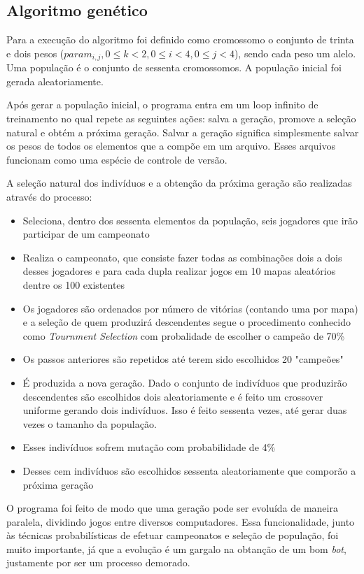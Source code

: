 \documentclass[a4paper,titlepage,11pt]{article}
\begin{document}
\subsection{Algoritmo genético}
Para a execução do algoritmo foi definido como cromossomo o conjunto de trinta e dois pesos ($param_{i,j}, 0 \leq k < 2, 0 \leq i < 4, 0 \leq j < 4$), sendo cada peso um alelo. Uma população é o conjunto de sessenta cromossomos. A população inicial foi gerada aleatoriamente.

Após gerar a população inicial, o programa entra em um loop infinito de treinamento no qual repete as seguintes ações: salva a geração, promove a seleção natural e obtém a próxima geração. Salvar a geração significa simplesmente salvar os pesos de todos os elementos que a compõe em um arquivo. Esses arquivos funcionam como uma espécie de controle de versão.

A seleção natural dos indivíduos e a obtenção da próxima geração são realizadas através do processo:
\begin{itemize}
	\item Seleciona, dentro dos sessenta elementos da população, seis jogadores que irão participar de um campeonato
	\item Realiza o campeonato, que consiste fazer todas as combinações dois a dois desses jogadores e para cada dupla realizar jogos em 10 mapas aleatórios dentre os 100 existentes 
	\item Os jogadores são ordenados por número de vitórias (contando uma por mapa) e a seleção de quem produzirá descendentes segue o procedimento conhecido como {\em Tournment Selection} com probalidade de escolher o campeão de 70\%
	\item Os passos anteriores são repetidos até terem sido escolhidos 20 "campeões"
	\item É produzida a nova geração. Dado o conjunto de indivíduos que produzirão descendentes são escolhidos dois aleatoriamente e é feito um crossover uniforme gerando dois indivíduos. Isso é feito sessenta vezes, até gerar duas vezes o tamanho da população. 
	\item Esses indivíduos sofrem mutação com probabilidade de 4\%
	\item Desses cem indivíduos são escolhidos sessenta aleatoriamente que comporão a próxima geração
\end{itemize}

O programa foi feito de modo que uma geração pode ser evoluída de maneira paralela, dividindo jogos entre diversos computadores. Essa funcionalidade, junto às técnicas probabilísticas de efetuar campeonatos e seleção de população, foi muito importante, já que a evolução é um gargalo na obtanção de um bom {\em bot}, justamente por ser um processo demorado.
\end{document}
